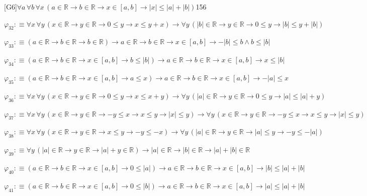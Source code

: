 \begin{fullproof}{[G6]}{$\forall a\,\forall b\,\forall x\,(a \in \mathbb{R} \to b \in \mathbb{R} \to x \in [a,b] \to \lvert x \rvert \leq \lvert a \rvert + \lvert b \rvert)$}{156}
\begin{abbrevlist}
\item $\varphi_{32} :\equiv \forall x\,\forall y\,(x \in \mathbb{R} \to y \in \mathbb{R} \to 0 \leq y \to x \leq y + x) \to \forall y\,(\lvert b \rvert \in \mathbb{R} \to y \in \mathbb{R} \to 0 \leq y \to \lvert b \rvert \leq y + \lvert b \rvert)$
\item $\varphi_{33} :\equiv (a \in \mathbb{R} \to b \in \mathbb{R} \to b \in \mathbb{R}) \to a \in \mathbb{R} \to b \in \mathbb{R} \to x \in [a,b] \to -\lvert b \rvert \leq b \land b \leq \lvert b \rvert$
\item $\varphi_{34} :\equiv (a \in \mathbb{R} \to b \in \mathbb{R} \to x \in [a,b] \to b \leq \lvert b \rvert) \to a \in \mathbb{R} \to b \in \mathbb{R} \to x \in [a,b] \to x \leq \lvert b \rvert$
\item $\varphi_{35} :\equiv (a \in \mathbb{R} \to b \in \mathbb{R} \to x \in [a,b] \to a \leq x) \to a \in \mathbb{R} \to b \in \mathbb{R} \to x \in [a,b] \to -\lvert a \rvert \leq x$
\item $\varphi_{36} :\equiv \forall x\,\forall y\,(x \in \mathbb{R} \to y \in \mathbb{R} \to 0 \leq y \to x \leq x + y) \to \forall y\,(\lvert a \rvert \in \mathbb{R} \to y \in \mathbb{R} \to 0 \leq y \to \lvert a \rvert \leq \lvert a \rvert + y)$
\item $\varphi_{37} :\equiv \forall x\,\forall y\,(x \in \mathbb{R} \to y \in \mathbb{R} \to -y \leq x \to x \leq y \to \lvert x \rvert \leq y) \to \forall y\,(x \in \mathbb{R} \to y \in \mathbb{R} \to -y \leq x \to x \leq y \to \lvert x \rvert \leq y)$
\item $\varphi_{38} :\equiv \forall x\,\forall y\,(x \in \mathbb{R} \to y \in \mathbb{R} \to x \leq y \to -y \leq -x) \to \forall y\,(\lvert a \rvert \in \mathbb{R} \to y \in \mathbb{R} \to \lvert a \rvert \leq y \to -y \leq -\lvert a \rvert)$
\item $\varphi_{39} :\equiv \forall y\,(\lvert a \rvert \in \mathbb{R} \to y \in \mathbb{R} \to \lvert a \rvert + y \in \mathbb{R}) \to \lvert a \rvert \in \mathbb{R} \to \lvert b \rvert \in \mathbb{R} \to \lvert a \rvert + \lvert b \rvert \in \mathbb{R}$
\item $\varphi_{40} :\equiv (a \in \mathbb{R} \to b \in \mathbb{R} \to x \in [a,b] \to 0 \leq \lvert a \rvert) \to a \in \mathbb{R} \to b \in \mathbb{R} \to x \in [a,b] \to \lvert b \rvert \leq \lvert a \rvert + \lvert b \rvert$
\item $\varphi_{41} :\equiv (a \in \mathbb{R} \to b \in \mathbb{R} \to x \in [a,b] \to 0 \leq \lvert b \rvert) \to a \in \mathbb{R} \to b \in \mathbb{R} \to x \in [a,b] \to \lvert a \rvert \leq \lvert a \rvert + \lvert b \rvert$

\end{abbrevlist}
\end{fullproof}
